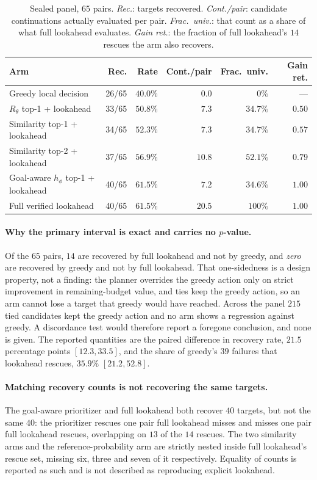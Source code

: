\begin{table}[h]
\centering
{\small\setlength{\tabcolsep}{4pt}
\begin{tabular}{lrrrrr}
\toprule
Arm & Rec. & Rate & Cont./pair & Frac.\ univ. & Gain ret. \\
\midrule
Greedy local decision            & 26/65 & $40.0\%$ & $0.0$  & $0\%$    & --- \\
$R_\theta$ top-1 + lookahead     & 33/65 & $50.8\%$ & $7.3$  & $34.7\%$ & $0.50$ \\
Similarity top-1 + lookahead     & 34/65 & $52.3\%$ & $7.3$  & $34.7\%$ & $0.57$ \\
Similarity top-2 + lookahead     & 37/65 & $56.9\%$ & $10.8$ & $52.1\%$ & $0.79$ \\
Goal-aware $h_\phi$ top-1 + lookahead & 40/65 & $61.5\%$ & $7.2$ & $34.6\%$ & $1.00$ \\
Full verified lookahead          & 40/65 & $61.5\%$ & $20.5$ & $100\%$  & $1.00$ \\
\bottomrule
\end{tabular}}
\caption{\small Sealed panel, $65$ pairs. \emph{Rec.}: targets recovered. \emph{Cont./pair}: candidate continuations actually evaluated per pair. \emph{Frac.\ univ.}: that count as a share of what full lookahead evaluates. \emph{Gain ret.}: the fraction of full lookahead's $14$ rescues the arm also recovers.}
\label{tab:lookahead-full}
\end{table}

\paragraph{Why the primary interval is exact and carries no $p$-value.}
Of the $65$ pairs, $14$ are recovered by full lookahead and not by greedy, and \emph{zero} are recovered by greedy and not by full lookahead. That one-sidedness is a design property, not a finding: the planner overrides the greedy action only on strict improvement in remaining-budget value, and ties keep the greedy action, so an arm cannot lose a target that greedy would have reached. Across the panel $215$ tied candidates kept the greedy action and no arm shows a regression against greedy. A discordance test would therefore report a foregone conclusion, and none is given. The reported quantities are the paired difference in recovery rate, $21.5$ percentage points $[12.3,33.5]$, and the share of greedy's $39$ failures that lookahead rescues, $35.9\%$ $[21.2,52.8]$.

\paragraph{Matching recovery counts is not recovering the same targets.}
The goal-aware prioritizer and full lookahead both recover $40$ targets, but not the same $40$: the prioritizer rescues one pair full lookahead misses and misses one pair full lookahead rescues, overlapping on $13$ of the $14$ rescues. The two similarity arms and the reference-probability arm are strictly nested inside full lookahead's rescue set, missing six, three and seven of it respectively. Equality of counts is reported as such and is not described as reproducing explicit lookahead.

